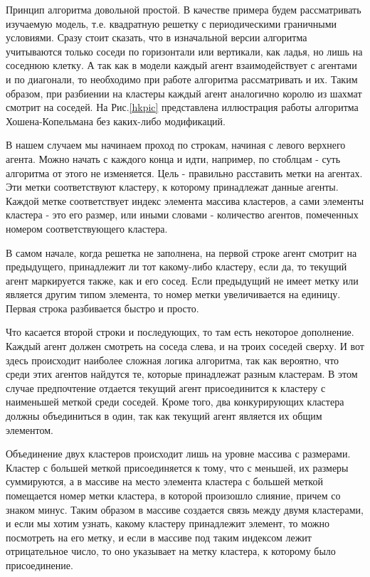 \documentclass[12pt,a4paper]{article}
\begin{document}
	\par Принцип алгоритма довольной простой. В качестве примера будем рассматривать изучаемую модель, т.е. квадратную решетку с периодическими граничными условиями. Сразу стоит сказать, что в изначальной версии алгоритма учитываются только соседи по горизонтали или вертикали, как ладья, но лишь на соседнюю клетку. А так как в модели каждый агент взаимодействует с агентами и по диагонали, то необходимо при работе алгоритма рассматривать и их. Таким образом, при разбиении на кластеры каждый агент аналогично королю из шахмат смотрит на соседей. На Рис.\ref{hkpic} представлена иллюстрация работы алгоритма Хошена-Копельмана без каких-либо модификаций.   
	\par В нашем случаем мы начинаем проход по строкам, начиная с левого верхнего агента. Можно начать с каждого конца и идти, например, по стоблцам - суть алгоритма от этого не изменяется. Цель - правильно расставить метки на агентах. Эти метки соответствуют кластеру, к которому принадлежат данные агенты. Каждой метке соответствует индекс элемента массива кластеров, а сами элементы кластера - это его размер, или иными словами - количество агентов, помеченных номером соответствующего кластера.
	\par В самом начале, когда решетка не заполнена, на первой строке агент смотрит на предыдущего, принадлежит ли тот какому-либо кластеру, если да, то текущий агент маркируется также, как и его сосед. Если предыдущий не имеет метку или является другим типом элемента, то номер метки увеличивается на единицу. Первая строка разбивается быстро и просто. 
	\par Что касается второй строки и последующих, то там есть некоторое дополнение. Каждый агент должен смотреть на соседа слева, и на троих соседей сверху. И вот здесь происходит наиболее сложная логика алгоритма, так как вероятно, что среди этих агентов найдутся те, которые принадлежат разным кластерам. В этом случае предпочтение отдается текущий агент присоединится к кластеру с наименьшей меткой среди соседей. Кроме того, два конкурирующих кластера должны объединиться в один, так как текущий агент является их общим элементом. 
	\par Объединение двух кластеров происходит лишь на уровне массива с размерами. Кластер с большей меткой присоединяется к тому, что с меньшей, их размеры суммируются, а в массиве на место элемента кластера с большей меткой помещается номер метки кластера, в которой произошло слияние, причем со знаком минус. Таким образом в массиве создается связь между двумя кластерами, и если мы хотим узнать, какому кластеру принадлежит элемент, то можно посмотреть на его метку, и если в массиве под таким индексом лежит отрицательное число, то оно указывает на метку кластера, к которому было присоединение.
	
\end{document}
